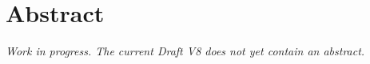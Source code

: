 \section*{Abstract}
\textit{Work in progress. The current Draft V8 does not yet contain an abstract.}
